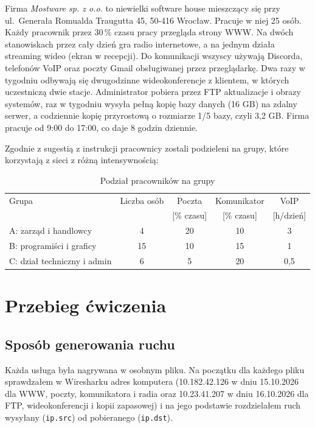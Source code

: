 \documentclass[12pt,a4paper]{article}
\begin{document}
Firma \emph{Mostware sp. z o.o.} to niewielki software house mieszczący się przy
ul.~Generała Romualda Traugutta 45, 50-416 Wrocław. Pracuje w niej 25 osób. Każdy pracownik
przez 30\,\% czasu pracy przegląda strony WWW. Na dwóch stanowiskach przez cały dzień gra radio
internetowe, a na jednym działa streaming wideo (ekran w recepcji). Do komunikacji wszyscy używają
Discorda, telefonów VoIP oraz poczty Gmail obsługiwanej przez przeglądarkę. Dwa razy w tygodniu
odbywają się dwugodzinne wideokonferencje z klientem, w których uczestniczą dwie stacje.
Administrator pobiera przez FTP aktualizacje i obrazy systemów, raz w tygodniu wysyła pełną kopię
bazy danych (16 GB) na zdalny serwer, a codziennie kopię przyrostową o rozmiarze 1/5 bazy, czyli 3,2 GB.
Firma pracuje od 9:00 do 17:00, co daje 8 godzin dziennie.

Zgodnie z sugestią z instrukcji pracownicy zostali podzieleni na grupy, które korzystają z sieci
z różną intensywnością:

\begin{table}[H]\centering
\begin{tabular}{>{\raggedright}p{4.2cm}cccc}
\toprule
Grupa & Liczba osób & Poczta & Komunikator & VoIP \\
 & & [\% czasu] & [\% czasu] & [h/dzień] \\
\midrule
A: zarząd i handlowcy & 4 & 20 & 10 & 3 \\
B: programiści i graficy & 15 & 10 & 15 & 1 \\
C: dział techniczny i admin & 6 & 5 & 20 & 0,5 \\
\bottomrule
\end{tabular}
\caption{Podział pracowników na grupy}
\end{table}

\section{Przebieg ćwiczenia}

\subsection{Sposób generowania ruchu}

Każda usługa była nagrywana w osobnym pliku. Na początku dla każdego pliku sprawdzałem w
Wiresharku adres komputera (10.182.42.126 w dniu 15.10.2026 dla WWW, poczty, komunikatora i radia oraz 10.23.41.207
w dniu 16.10.2026 dla FTP, wideokonferencji i kopii zapasowej) i na jego podstawie rozdzielałem ruch wysyłany (\texttt{ip.src})
od pobieranego (\texttt{ip.dst}).
\end{document}
